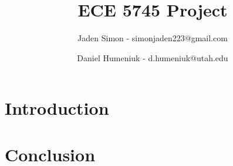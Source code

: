 \documentclass[11pt]{report}
\title{ECE 5745 Project}
\author{Jaden Simon - simonjaden223@gmail.com \\ \and
	   Daniel Humeniuk - d.humeniuk@utah.edu}
\begin{document}
\maketitle

\begin{abstract}

\end{abstract}

\section{Introduction}

\section{Conclusion}



%
\end{document}
